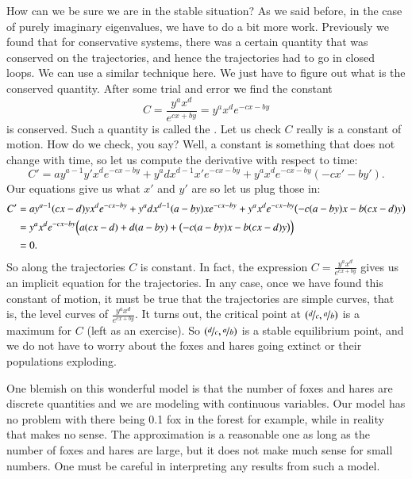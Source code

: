 How can we be sure we are in the stable situation?
As we said before, in the case of purely imaginary eigenvalues, we have to
do a bit more work.  Previously we found that for conservative systems,
there was a certain quantity that was conserved on the trajectories, and
hence the trajectories had to go in closed loops.
We can use a similar technique here.  We just have to figure out what is the
conserved quantity.  After some trial and error we find the
constant
\begin{equation*}
C = \frac{y^a x^d}{e^{cx+by}} = y^a x^d e^{-cx-by}
\end{equation*}
is conserved.  Such a quantity is called the \emph{}.  Let us check $C$ really is a constant of motion.  How do we check, you say?  Well, a constant is
something that does not change with time, so let us compute the derivative
with respect to time:
\begin{equation*}
C' = 
a y^{a-1}y' x^d e^{-cx-by}
+
y^a d x^{d-1} x' e^{-cx-by}
+
y^a x^d e^{-cx-by} (-cx'-by') .
\end{equation*}
Our equations give us what $x'$ and $y'$ are so let us plug those in:
\begin{equation*}
\begin{split}
C' & = 
a y^{a-1} (cx-d)y x^d e^{-cx-by}
+
y^a d x^{d-1} (a-by)x e^{-cx-by}
+
y^a x^d e^{-cx-by} \bigl(-c(a-by)x-b(cx-d)y\bigr)
\\
& =
y^a x^d e^{-cx-by}
\Bigl(
a (cx-d)
+
d (a-by)
+
\bigl(-c(a-by)x-b(cx-d)y\bigr) \Bigr)
\\
& = 
0 .
\end{split}
\end{equation*}
So along the trajectories $C$ is constant.  In fact, the expression $C =
\frac{y^a x^d}{e^{cx+by}}$ gives us an implicit equation for the
trajectories.  In any case, once we have found this constant of motion,
it must be true that the
trajectories are simple curves, that is, the level curves of
$\frac{y^a x^d}{e^{cx+by}}$.  It turns out, the critical point at
$(\nicefrac{d}{c},\nicefrac{a}{b})$ is a maximum for $C$ (left as an exercise).
So $(\nicefrac{d}{c},\nicefrac{a}{b})$ is a stable equilibrium point, and 
we do not have to worry about the foxes and hares going extinct or their
populations exploding.

One blemish on this wonderful model is that the number of foxes and hares
are discrete quantities and we are modeling with continuous variables.  Our
model has no problem with there being 0.1 fox in the forest for example,
while in reality that makes no sense.  The approximation is a reasonable one
as long as the number of foxes and hares are large, but it does not make
much sense for small numbers.  One must be careful in interpreting any
results from such a model.


